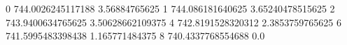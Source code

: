 0 744.0026245117188 3.56884765625
1 744.086181640625 3.65240478515625
2 743.9400634765625 3.50628662109375
4 742.8191528320312 2.3853759765625
6 741.5995483398438 1.165771484375
8 740.4337768554688 0.0

